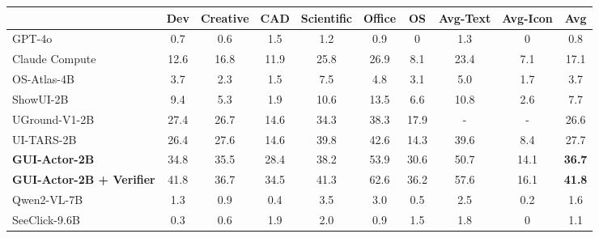 \begin{table}[!t]
{\begin{tabular}{lccccccccc}
\toprule
& \textbf{Dev} & \textbf{Creative} & \textbf{CAD} & \textbf{Scientific} & \textbf{Office} & \textbf{OS} & \textbf{Avg-Text} & \textbf{Avg-Icon} & \cellcolor{lightblue}\textbf{Avg} \\
\midrule
GPT-4o & 0.7 & 0.6 & 1.5 & 1.2 & 0.9 & 0 & 1.3 & 0 & \cellcolor{lightblue}0.8 \\
Claude Compute & 12.6 & 16.8 & 11.9 & 25.8 & 26.9 & 8.1 & 23.4 & 7.1 & \cellcolor{lightblue}17.1 \\
\midrule
OS-Atlas-4B & 3.7 & 2.3 & 1.5 & 7.5 & 4.8 & 3.1 & 5.0 & 1.7 & \cellcolor{lightblue}3.7 \\
ShowUI-2B & 9.4 & 5.3 & 1.9 & 10.6 & 13.5 & 6.6 & 10.8 & 2.6 & \cellcolor{lightblue}7.7 \\
UGround-V1-2B & 27.4 & 26.7 & 14.6 & 34.3 & 38.3 & 17.9 & - & - & \cellcolor{lightblue}26.6 \\
UI-TARS-2B & 26.4 & 27.6 & 14.6 & 39.8 & 42.6 & 14.3 & 39.6 & 8.4 & \cellcolor{lightblue}27.7 \\
\cellcolor{lightblue}\textbf{GUI-Actor-2B} & \cellcolor{lightblue}34.8 & \cellcolor{lightblue}35.5 & \cellcolor{lightblue}28.4 & \cellcolor{lightblue}38.2 & \cellcolor{lightblue}53.9 & \cellcolor{lightblue}30.6 & \cellcolor{lightblue}50.7 & \cellcolor{lightblue}14.1 & \cellcolor{lightblue}\textbf{36.7}\\
\cellcolor{lightblue}\textbf{GUI-Actor-2B + Verifier} &  \cellcolor{lightblue}41.8 & \cellcolor{lightblue}36.7 & \cellcolor{lightblue}34.5 & \cellcolor{lightblue}41.3 & \cellcolor{lightblue}62.6 & \cellcolor{lightblue}36.2 & \cellcolor{lightblue}57.6 & \cellcolor{lightblue}16.1 & \cellcolor{lightblue}\textbf{41.8} \\
\midrule
Qwen2-VL-7B & 1.3 & 0.9 & 0.4 & 3.5 & 3.0 & 0.5 & 2.5 & 0.2 & \cellcolor{lightblue}1.6 \\
SeeClick-9.6B & 0.3 & 0.6 & 1.9 & 2.0 & 0.9 & 1.5 & 1.8 & 0 & \cellcolor{lightblue}1.1 \\

\end{tabular}}
\end{table}
